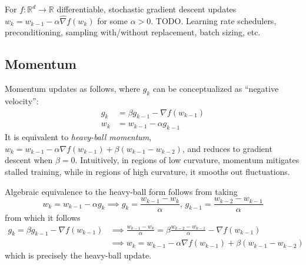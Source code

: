 \documentclass[11pt, letterpaper]{article}
\begin{document}
\begin{concept}
    For \(f : \mathbb{R}^d \to \mathbb{R}\) differentiable, stochastic gradient descent updates \(w_k = w_{k-1} - \alpha \widehat{\nabla} f(w_k)\) for some \(\alpha > 0\). TODO. Learning rate schedulers, preconditioning, sampling with/without replacement, batch sizing, etc. 
\end{concept}

\subsection{Momentum}

\begin{concept}[Momentum]
    Momentum updates as follows, where \(g_k\) can be conceptualized as ``negative velocity'': 
    \begin{align*}
        g_k &= \beta g_{k-1} - \nabla f(w_{k-1}) \\
        w_k &= w_{k-1} - \alpha g_{k-1}
    \end{align*}
    It is equivalent to \textit{heavy-ball momentum}, \(w_k = w_{k-1} - \alpha \nabla f(w_{k-1}) + \beta (w_{k-1} - w_{k-2})\), and reduces to gradient descent when \(\beta = 0\). Intuitively, in regions of low curvature, momentum mitigates stalled training, while in regions of high curvature, it smooths out fluctuations. 
\end{concept}

\begin{remark}
    Algebraic equivalence to the heavy-ball form follows from taking
    \[
        w_k = w_{k-1} - \alpha g_k
        \implies g_k = \frac{w_{k-1} - w_k}{\alpha},\, g_{k-1} = \frac{w_{k-2} - w_{k-1}}{\alpha}
    \]
    from which it follows
    \begin{align*}
        g_k = \beta g_{k-1} - \nabla f(w_{k-1})
        &\implies \frac{w_{k-1} - w_k}{\alpha} = \beta \frac{w_{k-2} - w_{k-1}}{\alpha} - \nabla f(w_{k-1}) \\
        &\implies w_k = w_{k-1} - \alpha \nabla f(w_{k-1}) + \beta (w_{k-1} - w_{k-2})
    \end{align*}
    which is precisely the heavy-ball update. 
\end{remark}
\end{document}
